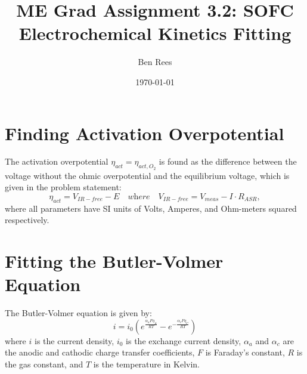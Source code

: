 \documentclass[11pt]{article}
\title{ME Grad Assignment 3.2: SOFC Electrochemical Kinetics Fitting}
\author{Ben Rees}
\date{\today}
\begin{document}
\maketitle

\section{Finding Activation Overpotential}

The activation overpotential $\eta_{act} = \eta_{act,O_2}$ is found as the difference between the voltage without the ohmic 
overpotential and the equilibrium voltage, which is given in the problem statement:
$$
\eta_{act} = V_{IR-free} - E \quad\textit{where}\quad V_{IR-free} = V_{meas} - I \cdot R_{ASR},
$$
where all parameters have SI units of Volts, Amperes, and Ohm-meters squared respectively. 

\section{Fitting the Butler-Volmer Equation}
The Butler-Volmer equation is given by:
$$
i = i_0 \left( e^{\frac{\alpha_a F \eta_{A}}{RT}} - e^{-\frac{\alpha_c F \eta_{C}}{RT}} \right)
$$
where $i$ is the current density, $i_0$ is the exchange current density, $\alpha_a$ and $\alpha_c$ are the anodic and cathodic 
charge transfer coefficients, $F$ is Faraday's constant, $R$ is the gas constant, and $T$ is the temperature in Kelvin.
\end{document}
